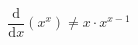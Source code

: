 \documentclass[15pt,landscape]{article}
\begin{document}
$$
\frac{\mathrm{d}}{\mathrm{d} x}\left(x^{x}\right)\neq x \cdot x^{x-1}
$$
\end{document}
